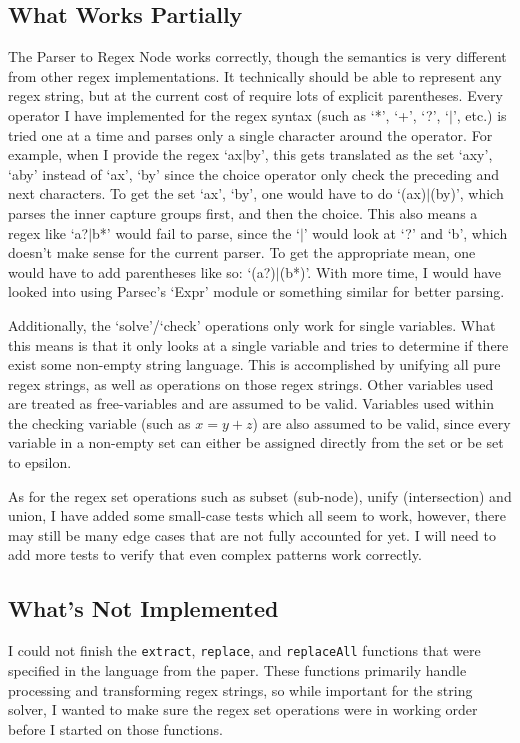\documentclass[letterpaper, 11pt]{article}
\begin{document}
\subsection{What Works Partially}\label{sec:partially}
The Parser to Regex Node works correctly, though the semantics is very different from other regex implementations.
It technically should be able to represent any regex string, but at the current cost of require lots of explicit parentheses.
Every operator I have implemented for the regex syntax (such as `*', `+', `?', `$|$', etc.) is tried one at a time and parses only a single character around the operator.
For example, when I provide the regex `ax$|$by', this gets translated as the set {`axy', `aby'} instead of {`ax', `by'} since the choice operator only check the preceding and next characters.
To get the set {`ax', `by'}, one would have to do `(ax)$|$(by)', which parses the inner capture groups first, and then the choice.
This also means a regex like `a?$|$b*' would fail to parse, since the `$|$' would look at `?' and `b', which doesn't make sense for the current parser.
To get the appropriate mean, one would have to add parentheses like so: `(a?)$|$(b*)'.
With more time, I would have looked into using Parsec's `Expr' module or something similar for better parsing.

Additionally, the `solve'/`check' operations only work for single variables.
What this means is that it only looks at a single variable and tries to determine if there exist some non-empty string language.
This is accomplished by unifying all pure regex strings, as well as operations on those regex strings.
Other variables used are treated as free-variables and are assumed to be valid.
Variables used within the checking variable (such as $x = y + z$) are also assumed to be valid, since every variable in a non-empty set can either be assigned directly from the set or be set to epsilon.

As for the regex set operations such as subset (sub-node), unify (intersection) and union, I have added some small-case tests which all seem to work, however, there may still be many edge cases that are not fully accounted for yet.
I will need to add more tests to verify that even complex patterns work correctly.

\subsection{What's Not Implemented}\label{sec:not_impl}

I could not finish the \lstinline{extract}, \lstinline{replace}, and \lstinline{replaceAll} functions that were specified in the language from the paper. 
These functions primarily handle processing and transforming regex strings, so while important for the string solver, I wanted to make sure the regex set operations were in working order before I started on those functions.
\end{document}
